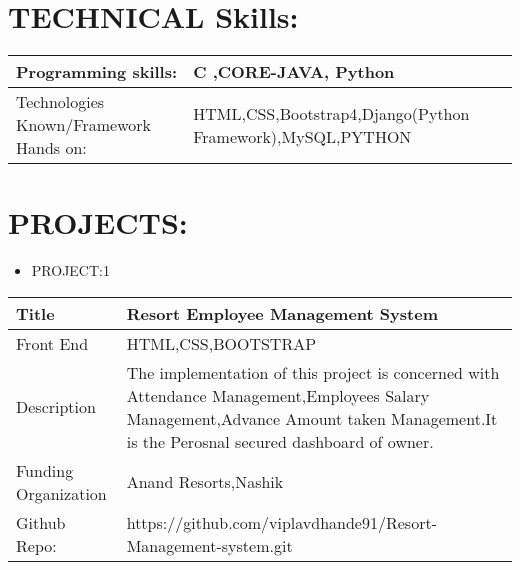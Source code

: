 \documentclass[a4paper,10pt]{article}
\begin{document}
\vspace{5mm}











\section{TECHNICAL Skills:}

\begin{tabu} to 0.8\textwidth { | X[l] | X[l] |  }
 \hline
 
 \large  Programming skills:  & C ,CORE-JAVA, Python\\
 
 \hline
\large  Technologies Known/Framework Hands on:  &   HTML,CSS,Bootstrap4,Django(Python Framework),MySQL,PYTHON   \\
  


\hline
\end{tabu}




\vspace{5mm}


\section{PROJECTS:}

\renewcommand{\labelitemi}{$\blacksquare$}
 
 
 \begin{itemize}
   \item {\large PROJECT:1}
   
 \end{itemize}


\begin{tabu} to 0.9\textwidth { | X[l] | X[2.5] | }
 \hline
 \large Title & Resort Employee Management System\\
 
 \hline
\large Front End  & HTML,CSS,BOOTSTRAP\\
 
\hline
\large Description & The implementation of this project is concerned with Attendance Management,Employees Salary Management,Advance Amount taken Management.It is the Perosnal secured dashboard of owner. \\
\hline
\large Funding Organization & Anand Resorts,Nashik \\
\hline

\large Github Repo: & https://github.com/viplavdhande91/Resort-Management-system.git \\
 

 
\hline
\end{tabu}
 
\end{document}
